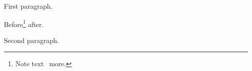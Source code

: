 \documentclass{article}
\begin{document}
First paragraph.

Before\footnote{Note text \lxmbf\ more.} after.

Second paragraph.
\end{document}
